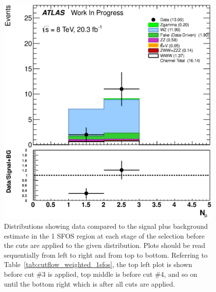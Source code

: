\begin{figure}[ht!]
\includegraphics[width=0.3\columnwidth]{figures/appendix_signal_selection/PreselectionJune2_NoSTVF_1SFOS_ChargeAbs1_ZVetoLow35High25GeV_BVeto85_METGt45GeV_DeltaPhi2p5_NJetLt2_physics/weight_all/eps/NMuons_histratio.eps}
\caption{Distributions showing data compared to the signal plus background estimate in the 1 SFOS region at each stage 
of the selection before the cuts are applied to the given distribution. Plots should be read sequentially from left to right
and from top to bottom. 
Referring to Table~\ref{tab:cutflow_weighted_1sfos}, the top left
plot is shown before cut \#3 is applied, top middle is before cut \#4, and
so on until the bottom right which is after all cuts are applied.}
\label{fig:1sfos}
\end{figure}


%

\clearpage
